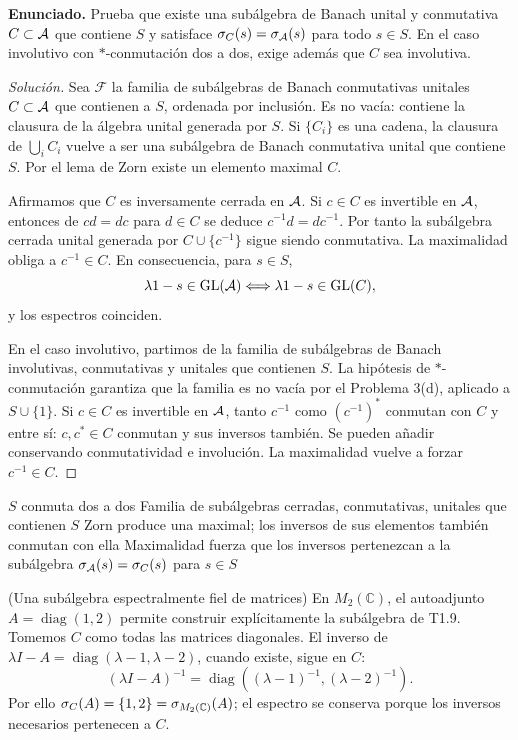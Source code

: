 \noindent\textbf{Enunciado.} Prueba que existe una subálgebra de Banach unital y conmutativa $C\subset\mathcal A$ que contiene $S$ y satisface $\sigma_C(s)=\sigma_\mathcal A(s)$ para todo $s\in S$. En el caso involutivo con $*$-conmutación dos a dos, exige además que $C$ sea involutiva.

\begin{proof}[Solución]
Sea $\mathscr F$ la familia de subálgebras de Banach conmutativas unitales $C\subset\mathcal A$ que contienen
a $S$, ordenada por inclusión. Es no vacía: contiene la clausura de la álgebra unital generada por
$S$. Si $\{C_i\}$ es una cadena, la clausura de $\bigcup_i C_i$ vuelve a ser una subálgebra de
Banach conmutativa unital que contiene $S$. Por el lema de Zorn existe un elemento maximal $C$.

Afirmamos que $C$ es inversamente cerrada en $\mathcal A$. Si $c\in C$ es invertible en $\mathcal A$, entonces
de $cd=dc$ para $d\in C$ se deduce $c^{-1}d=dc^{-1}$. Por tanto la subálgebra cerrada unital
generada por $C\cup\{c^{-1}\}$ sigue siendo conmutativa. La maximalidad obliga a
$c^{-1}\in C$. En consecuencia, para $s\in S$,
\[
\lambda1-s\in\operatorname{GL}(\mathcal A)\Longleftrightarrow\lambda1-s\in\operatorname{GL}(C),
\]
y los espectros coinciden.

En el caso involutivo, partimos de la familia de subálgebras de Banach involutivas, conmutativas y
unitales que contienen $S$. La hipótesis de $*$-conmutación garantiza que la familia es no vacía por
el Problema 3(d), aplicado a $S\cup\{1\}$. Si $c\in C$ es invertible en $\mathcal A$, tanto $c^{-1}$ como $(c^{-1})^*$ conmutan con
$C$ y entre sí: $c,c^*\in C$ conmutan y sus inversos también. Se pueden añadir conservando
conmutatividad e involución. La maximalidad vuelve a
forzar $c^{-1}\in C$.
\end{proof}

\proofdiagrambranch
{$S$ conmuta dos a dos}
{Familia de subálgebras cerradas, conmutativas, unitales que contienen $S$}
{Zorn produce una maximal; los inversos de sus elementos también conmutan con ella}
{Maximalidad fuerza que los inversos pertenezcan a la subálgebra}
{$\sigma_\mathcal A(s)=\sigma_C(s)$ para $s\in S$}

\begin{cthejemplo}{(Una subálgebra espectralmente fiel de matrices)}
En $M_2(\mathbb C)$, el autoadjunto $A=\operatorname{diag}(1,2)$ permite construir
explícitamente la subálgebra de T1.9.
Tomemos $C$ como todas las matrices diagonales. El inverso de
$\lambda I-A=\operatorname{diag}(\lambda-1,\lambda-2)$, cuando existe, sigue en $C$:
\[
 (\lambda I-A)^{-1}=\operatorname{diag}((\lambda-1)^{-1},(\lambda-2)^{-1}).
\]
Por ello $\sigma_C(A)=\{1,2\}=\sigma_{M_2(\mathbb C)}(A)$; el espectro se conserva porque
los inversos necesarios pertenecen a $C$.
\end{cthejemplo}

